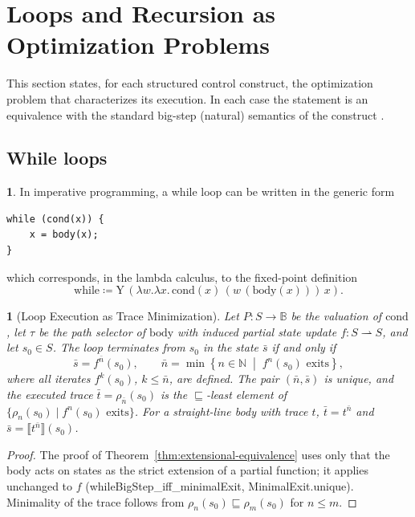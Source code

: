\documentclass[oneside,english]{amsart}
\numberwithin{equation}{section}
\numberwithin{figure}{section}
\theoremstyle{plain}
\theoremstyle{definition}
\theoremstyle{plain}
\newtheorem{prop}[thm]{\protect\propositionname}
\theoremstyle{remark}
\theoremstyle{plain}
\theoremstyle{definition}
\newtheorem*{defn*}{\protect\definitionname}
\theoremstyle{plain}
\theoremstyle{remark}
\newcommand{\sem}[1]{\llbracket #1 \rrbracket}
\newcommand{\lean}[1]{{\ttfamily\small #1}}
\providecommand{\definitionname}{Definition}
\providecommand{\propositionname}{Proposition}
\begin{document}
\section{Loops and Recursion as Optimization Problems}
\label{sec:optimization}

This section states, for each structured control construct, the optimization problem that characterizes its execution. In each case the statement is an equivalence with the standard big-step (natural) semantics of the construct \cite{winskel1993formal}.

\subsection{While loops}

\begin{defn*}
In imperative programming, a while loop can be written in the generic form

\begin{lstlisting}
while (cond(x)) {
    x = body(x);
}
\end{lstlisting}
which corresponds, in the lambda calculus, to the fixed-point definition \cite{manna1974mathematical}
\[
\text{while} \coloneqq \text{Y}\,\left(\lambda w.\lambda x.\, \text{cond}(x)\, (w\,(\text{body}(x)))\, x\right).
\]
\end{defn*}

\begin{prop}[Loop Execution as Trace Minimization]
\label{prop:min_x}
Let $P : S \to \mathbb{B}$ be the valuation of $\text{cond}$, let $\tau$ be the path selector of $\text{body}$ with induced partial state update $f : S \rightharpoonup S$, and let $s_0 \in S$. The loop terminates from $s_0$ in the state $\bar{s}$ if and only if
\[
\bar{s} = f^{\bar{n}}(s_0), \qquad \bar{n} = \min \left\{ n \in \mathbb{N} \;\middle|\; f^n(s_0) \text{ exits} \right\},
\]
where all iterates $f^k(s_0)$, $k \le \bar{n}$, are defined. The pair $(\bar{n}, \bar{s})$ is unique, and the executed trace $\bar{t} = \rho_{\bar{n}}(s_0)$ is the $\sqsubseteq$-least element of $\{\rho_n(s_0) \mid f^n(s_0) \text{ exits}\}$. For a straight-line body with trace $t$, $\bar{t} = t^{\bar{n}}$ and $\bar{s} = \sem{t^{\bar{n}}}(s_0)$.
\end{prop}

\begin{proof}
The proof of Theorem~\ref{thm:extensional-equivalence} uses only that the body acts on states as the strict extension of a partial function; it applies unchanged to $f$ (\lean{whileBigStep\_\allowbreak iff\_\allowbreak minimalExit}, \lean{MinimalExit.\allowbreak unique}). Minimality of the trace follows from $\rho_n(s_0) \sqsubseteq \rho_m(s_0)$ for $n \le m$.
\end{proof}
\end{document}
